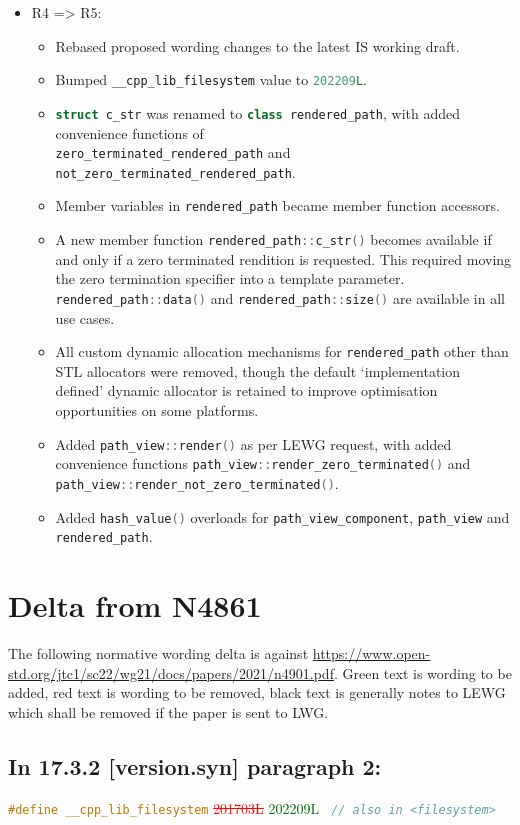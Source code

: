 \documentclass[11pt]{article}
\newcommand{\code}[2][cpp]{\lstinline[language=#1,basicstyle=\small\ttfamily]{#2}}
\newcommand{\tsrefp}[3]{\subsection*{In #2 \textbf{[#1]} paragraph #3:}}
\newcommand{\tsreplace}[3]{\textcolor{red}{\sout{#1}}#2\textcolor{darkgreen}{#3}}
\begin{document}
\begin{itemize}
    \item R4 => R5:
    \begin{itemize}
        \item Rebased proposed wording changes to the latest IS working draft.
        \item Bumped \code{__cpp_lib_filesystem} value to \code{202209L}.
        \item \code{struct c_str} was renamed to \code{class rendered_path}, with added convenience functions of \\
        \code{zero_terminated_rendered_path} and \code{not_zero_terminated_rendered_path}.
        \item Member variables in \code{rendered_path} became member function accessors.
        \item A new member function \code{rendered_path::c_str()} becomes available if and only if a zero terminated rendition is requested. This required moving the zero termination specifier into a template parameter. \code{rendered_path::data()} and \code{rendered_path::size()} are available in all use cases.
        \item All custom dynamic allocation mechanisms for \code{rendered_path} other than STL allocators were removed, though the default `implementation defined' dynamic allocator is retained to improve optimisation opportunities on some platforms.
        \item Added \code{path_view::render()} as per LEWG request, with added convenience functions \code{path_view::render_zero_terminated()} and \code{path_view::render_not_zero_terminated()}.
        \item Added \code{hash_value()} overloads for \code{path_view_component}, \code{path_view} and \code{rendered_path}.
    \end{itemize}
\end{itemize}

\section{Delta from N4861}

The following normative wording delta is against \url{https://www.open-std.org/jtc1/sc22/wg21/docs/papers/2021/n4901.pdf}. Green text is wording to be added, red text is wording to be removed, black text is generally notes to LEWG which shall be removed if the paper is sent to LWG.

\tsrefp{version.syn}{17.3.2}{2}

\code{#define __cpp_lib_filesystem}
\tsreplace{201703L}{ }{202209L}
\code{ // also in <filesystem>}
\end{document}
